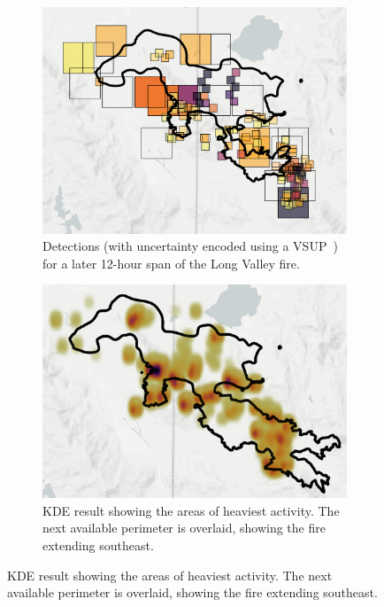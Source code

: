 \begin{figure}[h!]
    \begin{subfigure}{0.48\textwidth}
    \centering
    \includegraphics[width=\textwidth]{images/remote_sensing/kde_reference.png}
    \caption{Detections (with uncertainty encoded using a VSUP~\cite{VSUP}) for a later 12-hour span of the Long Valley fire.}
    \label{kde_ref}
    \end{subfigure}
    
    \begin{subfigure}[c]{0.48\textwidth}
    \centering
    \includegraphics[width=\textwidth]{images/remote_sensing/bandwidth_a_next.png}
    \caption{KDE result showing the areas of heaviest activity. The next available perimeter is overlaid, showing the fire extending southeast.}
    \label{kde_a}
    \end{subfigure}
    

\end{figure}
